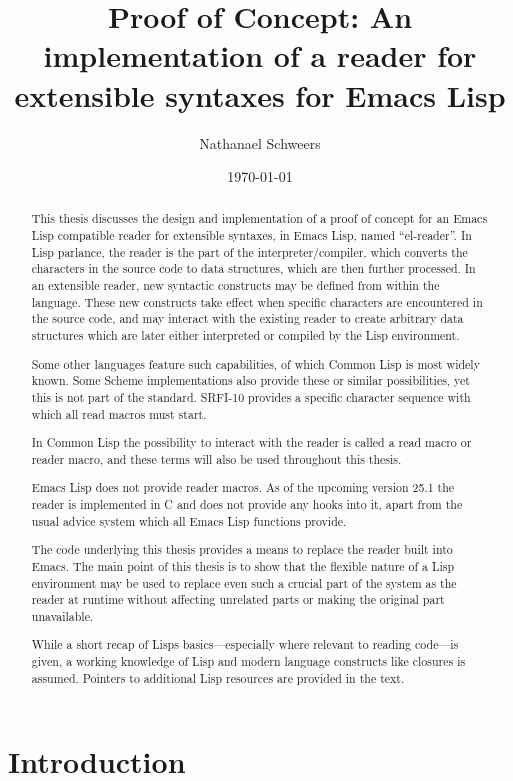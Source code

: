 \documentclass[a4paper,10pt,twoside]{report}
\author{Nathanael Schweers}
\date{\today}
\title{Proof of Concept: An implementation of a reader for extensible syntaxes for Emacs Lisp}
\newcommand{\el}{Emacs Lisp}
\newcommand{\cl}{Common Lisp}
\newcommand{\elr}{el-reader}
\begin{document}
\maketitle

\begin{abstract}
  This thesis discusses the design and implementation of a proof of concept for
  an \el{} compatible reader for extensible syntaxes, in \el{}, named
  ``\elr{}''.  In Lisp parlance, the reader is the part of the
  interpreter/compiler, which converts the characters in the source code to data
  structures, which are then further processed.  In an extensible reader, new
  syntactic constructs may be defined from within the language.  These new
  constructs take effect when specific characters are encountered in the source
  code, and may interact with the existing reader to create arbitrary data
  structures which are later either interpreted or compiled by the Lisp
  environment.

  Some other languages feature such capabilities, of which \cl{} is most widely
  known.  Some Scheme implementations also provide these or similar
  possibilities, yet this is not part of the standard.  SRFI-10 provides a
  specific character sequence with which all read macros must
  start. \cite{srfi-10}

  In \cl{} the possibility to interact with the reader is called a read macro or
  reader macro, and these terms will also be used throughout this thesis.

  \el{} does not provide reader macros.  As of the upcoming version 25.1 the
  reader is implemented in C and does not provide any hooks into it, apart from
  the usual advice system which all \el{} functions provide.

  The code underlying this thesis provides a means to replace the reader built
  into Emacs.  The main point of this thesis is to show that the flexible nature
  of a Lisp environment may be used to replace even such a crucial part of the
  system as the reader at runtime without affecting unrelated parts or making
  the original part unavailable.

  While a short recap of Lisps basics---especially where relevant to reading
  code---is given, a working knowledge of Lisp and modern language constructs
  like closures is assumed.  Pointers to additional Lisp resources are provided
  in the text.
\end{abstract}

\tableofcontents

\chapter{Introduction}
\label{chapter:introduction}
\end{document}
